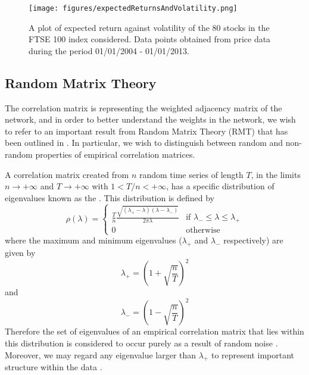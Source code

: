 \begin{figure}
	\centering
	\texttt{[image: figures/expectedReturnsAndVolatility.png]}
	\caption[Plot of expected return against volatility for 80 FTSE 100 stocks]{\label{fig:expectedReturnsAndVolatility} A plot of expected return against volatility of the 80 stocks in the FTSE 100 index considered. Data points obtained from price data during the period 01/01/2004 - 01/01/2013.}
\end{figure}


\subsection{Random Matrix Theory}
\label{subsec:randomMatrixTheory}

The correlation matrix is representing the weighted adjacency matrix of the network, and in order to better understand the weights in the network, we wish to refer to an important result from Random Matrix Theory (RMT) that has been outlined in \cite{SM99,PGR+99,PBL05,MG13}. In particular, we wish to distinguish between random and non-random properties of empirical correlation matrices.

A correlation matrix created from $n$ random time series of length $T$, in the limits $n \rightarrow +\infty$ and $T \rightarrow +\infty$ with $1 < T/n < +\infty$, has a specific distribution of eigenvalues known as the  \cite{SM99,PBL05,FPW+11,MG13}. This distribution is defined by 
\begin{equation}
	\label{def:senguptaMitraDistribution}
	\rho(\lambda) =	
	\begin{cases}
		\frac{T}{n}\frac{\sqrt{(\lambda_{+} - \lambda)(\lambda - \lambda_{-})}}{2\pi\lambda}& \text{if } \lambda_{-} \leq \lambda \leq \lambda_{+} \\
		0 & \text{otherwise}
	\end{cases}
\end{equation}
where the maximum and minimum eigenvalues ($\lambda_{+}$ and $\lambda_{-}$ respectively) are given by
\begin{equation}
\label{eq:maxEigenvalueSM}
	\lambda_{+} = \left(1+\sqrt{\frac{n}{T}}\right)^{2}
\end{equation}
and
\begin{equation}
\label{eq:minEigenvalueSM}
	\lambda_{-} = \left(1-\sqrt{\frac{n}{T}}\right)^{2}
\end{equation}
Therefore the set of eigenvalues of an empirical correlation matrix that lies within this distribution is considered to occur purely as a result of random noise \cite{PBL05,FPW+11,MG13}. Moreover, we may regard any eigenvalue larger than $\lambda_{+}$ to represent important structure within the data \cite{PBL05,FPW+11,MG13}.

